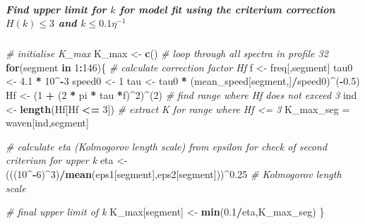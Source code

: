 \documentclass[]{article}
\newenvironment{Shaded}{\begin{snugshade}}{\end{snugshade}}
\newcommand{\KeywordTok}[1]{\textcolor[rgb]{0.13,0.29,0.53}{\textbf{#1}}}
\newcommand{\DecValTok}[1]{\textcolor[rgb]{0.00,0.00,0.81}{#1}}
\newcommand{\FloatTok}[1]{\textcolor[rgb]{0.00,0.00,0.81}{#1}}
\newcommand{\StringTok}[1]{\textcolor[rgb]{0.31,0.60,0.02}{#1}}
\newcommand{\CommentTok}[1]{\textcolor[rgb]{0.56,0.35,0.01}{\textit{#1}}}
\newcommand{\ControlFlowTok}[1]{\textcolor[rgb]{0.13,0.29,0.53}{\textbf{#1}}}
\newcommand{\OperatorTok}[1]{\textcolor[rgb]{0.81,0.36,0.00}{\textbf{#1}}}
\newcommand{\NormalTok}[1]{#1}
\let\oldsubparagraph\subparagraph
\renewcommand{\subparagraph}[1]{\oldsubparagraph{#1}\mbox{}}
\begin{document}
\subparagraph{\texorpdfstring{Find upper limit for \(k\) for model fit
using the criterium correction \(H(k) \leq 3\) and
\(k \leq 0.1 \eta ^{-1}\)}{Find upper limit for k for model fit using the criterium correction H(k) \textbackslash{}leq 3 and k \textbackslash{}leq 0.1 \textbackslash{}eta \^{}\{-1\}}}\label{find-upper-limit-for-k-for-model-fit-using-the-criterium-correction-hk-leq-3-and-k-leq-0.1-eta--1}

\begin{Shaded}
\begin{Highlighting}[]
\CommentTok{# initialise K_max}
\NormalTok{K_max <-}\StringTok{ }\KeywordTok{c}\NormalTok{()}
\CommentTok{# loop through all spectra in profile 32}
\ControlFlowTok{for}\NormalTok{(segment }\ControlFlowTok{in} \DecValTok{1}\OperatorTok{:}\DecValTok{146}\NormalTok{)\{}
  \CommentTok{# calculate correction factor Hf}
\NormalTok{  f <-}\StringTok{ }\NormalTok{freq[,segment]}
\NormalTok{  tau0 <-}\StringTok{ }\FloatTok{4.1} \OperatorTok{*}\StringTok{ }\DecValTok{10}\OperatorTok{^-}\DecValTok{3}
\NormalTok{  speed0 <-}\StringTok{ }\DecValTok{1}
\NormalTok{  tau <-}\StringTok{ }\NormalTok{tau0 }\OperatorTok{*}\StringTok{ }\NormalTok{(mean_speed[segment,]}\OperatorTok{/}\NormalTok{speed0)}\OperatorTok{^}\NormalTok{(}\OperatorTok{-}\FloatTok{0.5}\NormalTok{)}
\NormalTok{  Hf <-}\StringTok{ }\NormalTok{(}\DecValTok{1} \OperatorTok{+}\StringTok{ }\NormalTok{(}\DecValTok{2} \OperatorTok{*}\StringTok{ }\NormalTok{pi }\OperatorTok{*}\StringTok{ }\NormalTok{tau }\OperatorTok{*}\NormalTok{f)}\OperatorTok{^}\DecValTok{2}\NormalTok{)}\OperatorTok{^}\NormalTok{(}\DecValTok{2}\NormalTok{)}
  \CommentTok{# find range where Hf does not exceed 3}
\NormalTok{  ind <-}\StringTok{ }\KeywordTok{length}\NormalTok{(Hf[Hf }\OperatorTok{<=}\StringTok{ }\DecValTok{3}\NormalTok{])}
  \CommentTok{# extract K for range where Hf <= 3}
\NormalTok{  K_max_seg =}\StringTok{ }\NormalTok{waven[ind,segment]}
  
  \CommentTok{# calculate eta (Kolmogorov length scale) from epsilon for check of second criterium for upper k}
\NormalTok{  eta <-}\StringTok{ }\NormalTok{(((}\DecValTok{10}\OperatorTok{^-}\DecValTok{6}\NormalTok{)}\OperatorTok{^}\DecValTok{3}\NormalTok{)}\OperatorTok{/}\KeywordTok{mean}\NormalTok{(eps1[segment],eps2[segment]))}\OperatorTok{^}\FloatTok{0.25} \CommentTok{# Kolmogorov length scale}
  
  \CommentTok{# final upper limit of k}
\NormalTok{  K_max[segment] <-}\StringTok{ }\KeywordTok{min}\NormalTok{(}\FloatTok{0.1}\OperatorTok{/}\NormalTok{eta,K_max_seg)}
\NormalTok{\}}
\end{Highlighting}
\end{Shaded}
\end{document}
